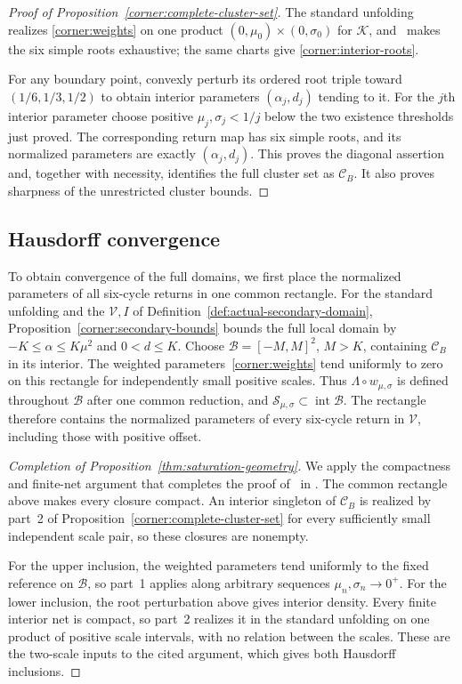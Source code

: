 \begin{proof}[Proof of Proposition~\ref{corner:complete-cluster-set}]
The standard unfolding realizes \eqref{corner:weights} on one product
$(0,\mu_0)\times(0,\sigma_0)$ for $\mathcal K$,
and~\cite[Proposition~\ref*{main-prop:common-count}]{main2026} makes the six
simple roots exhaustive; the same charts give \eqref{corner:interior-roots}.

For any boundary point, convexly perturb its ordered root triple toward
$(1/6,1/3,1/2)$ to obtain interior parameters $(\alpha_j,d_j)$ tending
to it. For the $j$th interior parameter choose
positive $\mu_j,\sigma_j<1/j$ below the two existence thresholds
just proved.  The corresponding return map has six simple roots,
and its normalized parameters are exactly $(\alpha_j,d_j)$.
This proves the diagonal assertion and, together with necessity,
identifies the full cluster set as $\mathcal C_B$.
It also proves sharpness of the unrestricted cluster bounds.

\end{proof}

\subsection{Hausdorff convergence}

To obtain convergence of the full domains, we first place the normalized
parameters of all six-cycle returns in one common rectangle.
For the standard unfolding and the $\mathcal V,I$ of
Definition~\ref{def:actual-secondary-domain},
Proposition~\ref{corner:secondary-bounds} bounds the full local domain by
$-K\le\alpha\le K\mu^2$ and $0<d\le K$. Choose
$\mathcal B=[-M,M]^2$, $M>K$, containing $\mathcal C_B$ in its interior.
The weighted parameters~\eqref{corner:weights} tend uniformly
to zero on this rectangle for independently small positive scales. Thus
$\Lambda\circ w_{\mu,\sigma}$ is defined throughout $\mathcal B$ after
one common reduction, and
$\mathscr S_{\mu,\sigma}\subset\operatorname{int}\mathcal B$.
The rectangle therefore contains the normalized parameters of every six-cycle
return in $\mathcal V$, including those with positive offset.

\begin{proof}[Completion of Proposition~\ref{thm:saturation-geometry}]
We apply the compactness and finite-net argument that completes the proof
of~\cite[Theorem~\ref*{main-thm:main-saturation-summary}]{main2026} in
\cite[Section~\ref*{main-subsec:four-root-limit}]{main2026}. The common rectangle above makes
every closure compact. An interior singleton of $\mathcal C_B$ is realized
by part~2 of
Proposition~\ref{corner:complete-cluster-set} for every sufficiently small
independent scale pair, so these closures are nonempty.

For the upper inclusion, the weighted parameters tend uniformly to the fixed
reference on $\mathcal B$, so part~1 applies along arbitrary sequences
$\mu_n,\sigma_n\to0^+$. For the lower inclusion, the root perturbation
above gives interior density. Every finite interior net is compact, so
part~2 realizes it in the standard unfolding on one product of positive
scale intervals, with no relation between the scales. These are the
two-scale inputs to the cited argument, which gives both Hausdorff inclusions.
\end{proof}
